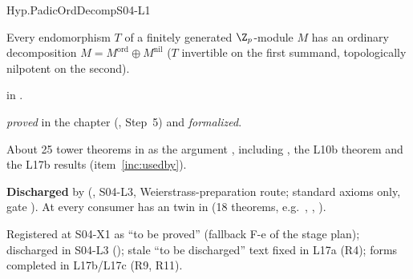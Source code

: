 \begin{hypentry}{Hyp.PadicOrdDecomp}{\kinddis}{S04-L1}
\item[Statement] Every endomorphism $T$ of a finitely generated $\Z_p$-module $M$ has an ordinary decomposition
  $M=M^{\mathrm{ord}}\oplus M^{\mathrm{nil}}$ ($T$ invertible on the first summand, topologically nilpotent on the second).
\item[Lean]  in .
\item[Source] \emph{proved} in the chapter (, Step~5) and \emph{formalized}.
\item[Used by] About 25 tower theorems in 
  as the argument , including , the L10b theorem  and the L17b
   results (item~\ref{inc:usedby}).
\item[Status] \textbf{Discharged} by 
  (, S04-L3, Weierstrass-preparation route; standard axioms only, gate
  ). At  every consumer has an  twin in
   (18 theorems, e.g.\ ,
  , ).
\item[History] Registered at S04-X1 as ``to be proved'' (fallback F-e of the stage plan); discharged in S04-L3
  (); stale ``to be discharged'' text fixed in L17a (R4);  forms completed in L17b/L17c
  (R9, R11).
\end{hypentry}

